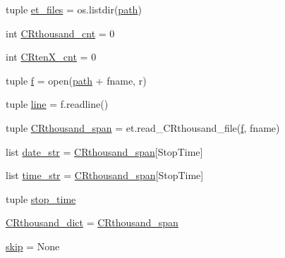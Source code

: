 \begin{DoxyCompactItemize}
\item 
tuple \hyperlink{namespace_date___ranges___concat__script_a475a3d107232b5bb9bd9a5ca10e92b7e}{et\+\_\+files} = os.\+listdir(\hyperlink{namespace_date___ranges___concat__script_a8333f861dcf7a2c4d8513c76222f5c6a}{path})
\item 
int \hyperlink{namespace_date___ranges___concat__script_abb2bf9b40692c8d7be5ca5538b9b5149}{C\+Rthousand\+\_\+cnt} = 0
\item 
int \hyperlink{namespace_date___ranges___concat__script_a75f2d0ae1ff003c8439ef1b27e325461}{C\+Rten\+X\+\_\+cnt} = 0
\item 
tuple \hyperlink{namespace_date___ranges___concat__script_ad5658856a51a27b2b1e1471fc153ad62}{f} = open(\hyperlink{namespace_date___ranges___concat__script_a8333f861dcf7a2c4d8513c76222f5c6a}{path} + fname, \textquotesingle{}r\textquotesingle{})
\item 
tuple \hyperlink{namespace_date___ranges___concat__script_a006bd1ae40aa6caa8031d62e130d3811}{line} = f.\+readline()
\item 
tuple \hyperlink{namespace_date___ranges___concat__script_a78202928a38556bf4ca275bd38d154de}{C\+Rthousand\+\_\+span} = et.\+read\+\_\+\+C\+Rthousand\+\_\+file(\hyperlink{namespace_date___ranges___concat__script_ad5658856a51a27b2b1e1471fc153ad62}{f}, fname)
\item 
list \hyperlink{namespace_date___ranges___concat__script_ac154a4bf135658a7c4bc6edd240bd2bc}{date\+\_\+str} = \hyperlink{namespace_date___ranges___concat__script_a78202928a38556bf4ca275bd38d154de}{C\+Rthousand\+\_\+span}\mbox{[}\textquotesingle{}Stop\+Time\textquotesingle{}\mbox{]}
\item 
list \hyperlink{namespace_date___ranges___concat__script_ace8dedb82d3f22c382b819ebb4656329}{time\+\_\+str} = \hyperlink{namespace_date___ranges___concat__script_a78202928a38556bf4ca275bd38d154de}{C\+Rthousand\+\_\+span}\mbox{[}\textquotesingle{}Stop\+Time\textquotesingle{}\mbox{]}
\item 
tuple \hyperlink{namespace_date___ranges___concat__script_a81b3856c7074c340f9a8124ee1335487}{stop\+\_\+time}
\item 
\hyperlink{namespace_date___ranges___concat__script_ad95c3578d6bdd82cd9b4c84a0f09d26d}{C\+Rthousand\+\_\+dict} = \hyperlink{namespace_date___ranges___concat__script_a78202928a38556bf4ca275bd38d154de}{C\+Rthousand\+\_\+span}
\item 
\hyperlink{namespace_date___ranges___concat__script_a68d09e2180475d8aa358ed77f0e0c076}{skip} = None
\item 

\end{DoxyCompactItemize}
